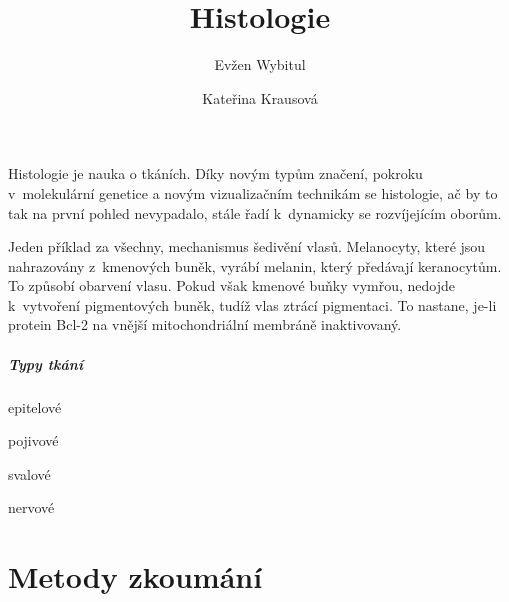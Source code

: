 \documentclass[DIV=8]{scrreprt}
\title{Histologie}
\author{Evžen Wybitul \and Kateřina Krausová}
\begin{document}
\begin{titlepage}
\maketitle
\end{titlepage}
\tableofcontents


Histologie je nauka o tkáních. Díky novým typům značení, pokroku v molekulární genetice a novým vizualizačním technikám se histologie, ač by to tak na první pohled nevypadalo, stále řadí k dynamicky se rozvíjejícím oborům.

Jeden příklad za všechny, mechanismus šedivění vlasů. Melanocyty, které jsou nahrazovány z kmenových buněk, vyrábí melanin, který předávají keranocytům. To způsobí obarvení vlasu. Pokud však kmenové buňky vymřou, nedojde k vytvoření pigmentových buněk, tudíž vlas ztrácí pigmentaci. To nastane, je-li protein Bcl-2 na vnější mitochondriální membráně inaktivovaný.

\paragraph{Typy tkání}
\begin{myItemize}[nosep]
    \item epitelové
    \item pojivové
    \item svalové
    \item nervové
\end{myItemize}



\chapter{Metody zkoumání} \label{Metody zkoumání}
\end{document}
